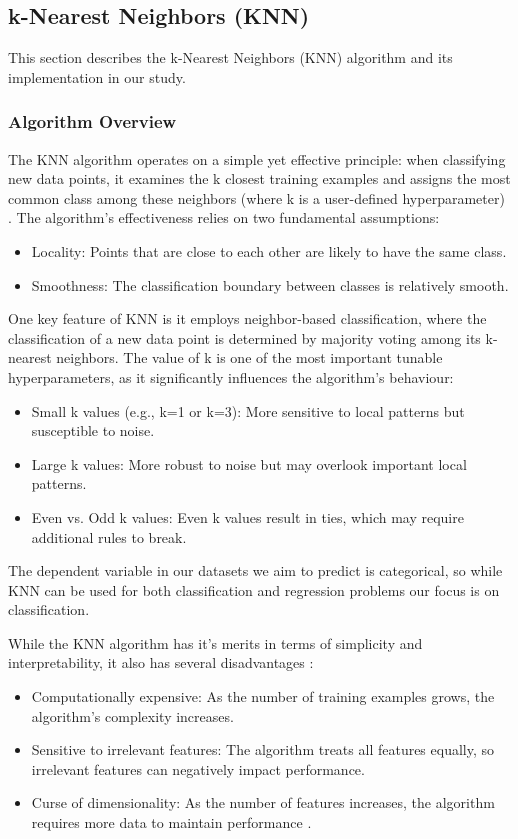 \subsection{k-Nearest Neighbors (KNN)}
\label{subsec:methods-knn}

This section describes the k-Nearest Neighbors (KNN) algorithm and its implementation in our study.

\subsubsection{Algorithm Overview}

The KNN algorithm operates on a simple yet effective principle: when classifying new data points, 
it examines the k closest training examples and assigns the most common class among these neighbors
(where k is a user-defined hyperparameter) \cite{knn}. 
The algorithm's effectiveness relies on two fundamental assumptions:
\begin{itemize}
    \item Locality: Points that are close to each other are likely to have the same class.
    \item Smoothness: The classification boundary between classes is relatively smooth.
\end{itemize}

One key feature of KNN is it employs neighbor-based classification, where the classification of a new data point 
is determined by majority voting among its k-nearest neighbors. 
The value of k is one of the most important tunable hyperparameters, as it significantly influences the algorithm's behaviour:
\begin{itemize}
    \item Small k values (e.g., k=1 or k=3): More sensitive to local patterns but susceptible to noise.
    \item Large k values: More robust to noise but may overlook important local patterns.
    \item Even vs. Odd k values: Even k values result in ties, which may require additional rules to break.
\end{itemize}

The dependent variable in our datasets we aim to predict is categorical, so while KNN can be used for both classification and regression problems 
our focus is on classification.

While the KNN algorithm has it's merits in terms of simplicity and interpretability, it also has several disadvantages \cite{distance_func_knn}:
\begin{itemize}
    \item Computationally expensive: As the number of training examples grows, the algorithm's complexity increases\cite{laviale2023}.
    \item Sensitive to irrelevant features: The algorithm treats all features equally, so irrelevant features can negatively impact performance.
    \item Curse of dimensionality: As the number of features increases, the algorithm requires more data to maintain performance \cite{dimensionality}.
\end{itemize}

